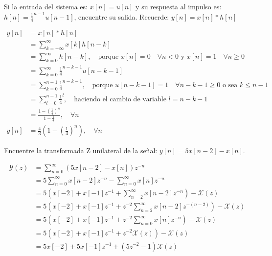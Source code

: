 \documentclass[addpoints,answers]{exam}
\begin{document}
\begin{questions}
\begin{solution}

\end{solution}

\question[5]
Si la entrada del sistema es: \(x[n] = u[n]\) y su respuesta al impulso es: \(h[n] = \frac{1}{4}^{n-1} u[n-1]\), encuentre su salida. Recuerde: \(y[n] = x[n] * h[n]\)

\begin{solution}
\[
\begin{array}{ll}
	y[n]	&= x[n] * h[n] \\
			&= \sum_{k=-\infty}^{\infty}x[k]h[n-k] \\
			&= \sum_{k=0}^{\infty}h[n-k], \quad \text{porque } x[n]=0 \quad \forall n<0 \text{ y } x[n]=1 \quad \forall n \geq 0 \\
			&= \sum_{k=0}^{\infty}\frac{1}{4}^{n-k-1} u[n-k-1] \\
			&= \sum_{k=0}^{n-1}\frac{1}{4}^{n-k-1}, \quad \text{porque } u[n-k-1]=1 \quad \forall n-k-1 \geq 0 \text{ o sea  } k \leq n-1 \\
			&= \sum_{l=0}^{n-1}\frac{1}{4}^{l}, \quad \text{haciendo el cambio de variable } l=n-k-1 \\
			&= \frac{1-\left(\frac{1}{4}\right)^n}{1-\frac{1}{4}}, \quad \forall n \\
	y[n]	&= \frac{4}{3}\left(1-\left(\frac{1}{4}\right)^n\right), \quad \forall n
\end{array}
\]
\end{solution}


\question[10]
Encuentre la transformada Z unilateral de la señal: \(y[n] = 5 x[n-2] - x[n]\).

\begin{solution}
\[
\begin{array}{ll}
	\mathscr{Y}(z)	&= \sum_{n=0}^{\infty} \left(5 x[n-2] - x[n]\right)z^{-n} \\
					&= 5 \sum_{n=0}^{\infty} x[n-2] z^{-n} - \sum_{n=0}^{\infty} x[n] z^{-n} \\
					&= 5 \left( x[-2] + x[-1] z^{-1} + \sum_{n=2}^{\infty} x[n-2] z^{-n} \right) - \mathscr{X}(z) \\
					&= 5 \left( x[-2] + x[-1] z^{-1} + z^{-2} \sum_{n=2}^{\infty} x[n-2] z^{-(n-2)} \right) - \mathscr{X}(z) \\
					&= 5 \left( x[-2] + x[-1] z^{-1} + z^{-2} \sum_{n=0}^{\infty} x[n] z^{-n} \right) - \mathscr{X}(z) \\
					&= 5 \left( x[-2] + x[-1] z^{-1} + z^{-2} \mathscr{X}(z) \right) - \mathscr{X}(z) \\
					&= 5 x[-2] + 5 x[-1] z^{-1} + \left(5 z^{-2} -1 \right) \mathscr{X}(z)
\end{array}
\]
\end{solution}



\end{questions}
\end{document}
